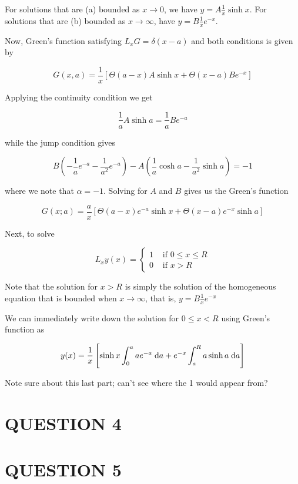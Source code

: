 \documentclass[a4paper]{article}
\begin{document}
For solutions that are (a) bounded as $ x \to 0 $, we have $ y = A \frac{1}{x} \sinh x $. For solutions that are (b) bounded as $ x \to \infty $, have $ y = B \frac{1}{x} e^{-x} $. 

Now, Green's function satisfying $ L_{x} G = \delta(x - a) $ and both conditions is given by 

\[ G(x,a) =  \frac{1}{x} \left[ \Theta(a-x) A \sinh x  +  \Theta(x - a) B e^{-x} \right]  \]

Applying the continuity condition we get

\[ \frac{1}{a} A \sinh a = \frac{1}{a} Be^{-a}   \]

while the jump condition gives 

\[ B \left(  - \frac{1}{a} e^{-a} - \frac{1}{a^{2}} e^{-a}   \right) - A \left( \frac{1}{a} \cosh a -  \frac{1}{a^{2}} \sinh a \right) = -1   \]

where we note that $ \alpha = -1 $. Solving for $ A $ and $ B $ gives us the Green's function

\[ G(x ; a) = \frac{a}{x} \left[ \Theta(a-x) e^{-a} \sinh x  +  \Theta(x - a) e^{-x}  \sinh a  \right]  \]

Next, to solve 

\[ L_{x}y(x) = \begin{cases} 1  & \text{ if } 0 \leq x \leq R \\ 0 & \text{ if } x > R  \end{cases} \]

Note that the solution for $ x > R $ is simply the solution of the homogeneous equation that is bounded when $ x \to \infty $, that is, $ y = B \frac{1}{x} e^{-x} $

We can immediately write down the solution for $ 0 \leq x < R $ using Green's function as 


\[ y(x) = \frac{1}{x} \left[ \sinh x  \int_{0}^{a} a e^{-a} \; \mathrm{d} a  + e^{-x} \int_{a}^{R}  a \sinh a \; \mathrm{d} a   \right]    \]



Note sure about this last part; can't see where the 1 would appear from?



\section{QUESTION 4}
\section{QUESTION 5}
\end{document}
